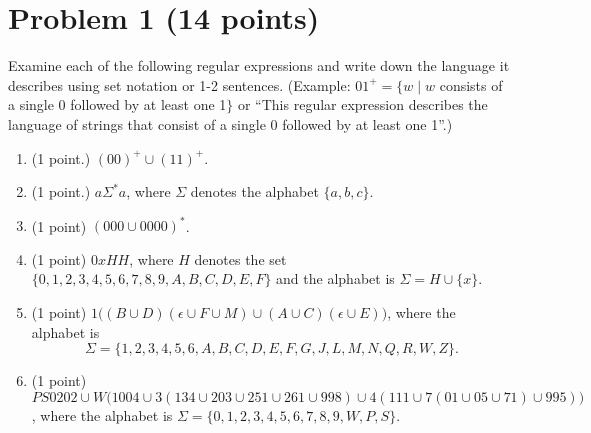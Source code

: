 \documentclass[letterpaper,11pt,twoside]{article}
\theoremstyle{plain}
\theoremstyle{definition}
\theoremstyle{remark}
\theoremstyle{restate}
\begin{document}
\clearpage
\section{Problem 1 (14 points)}

Examine each of the following regular expressions and write down the language it describes using set notation or 1-2 sentences. (Example: $01^+ = \{w \; | \; w $ consists of a single 0 followed by at least one 1$\}$ or ``This regular expression describes the language of strings that consist of a single 0 followed by at least one 1''.)

\begin{enumerate}
    \item (1 point.) $(00)^+ \cup (11)^+$.
    
    \item (1 point.) $a\Sigma^*a$, where $\Sigma$ denotes the alphabet $\{a, b, c\}$.
    
    \item (1 point) $(000 \cup 0000)^*$.
    
    \item (1 point) $0xHH$, where $H$ denotes the set $\{0, 1, 2, 3, 4, 5, 6, 7, 8, 9, A, B, C, D, E, F\}$ and the alphabet is $\Sigma = H \cup \{x\}$.
    
    \item (1 point) $1\big((B \cup D)(\epsilon \cup F \cup M) \cup (A \cup C)(\epsilon \cup E)\big)$, where the alphabet is 
    \[
        \Sigma = \{1, 2, 3, 4, 5, 6, A, B, C, D, E, F, G, J, L, M, N, Q, R, W, Z\}.
    \]
    
    \item (1 point) $PS0202 \cup W\big(1004 \cup 3(134 \cup 203 \cup 251 \cup 261 \cup 998) \cup 4(111 \cup 7(01 \cup 05 \cup 71) \cup 995))$, where the alphabet is $\Sigma = \{0, 1, 2, 3, 4, 5, 6, 7, 8, 9, W, P, S\}$.

\end{enumerate}
\end{document}
